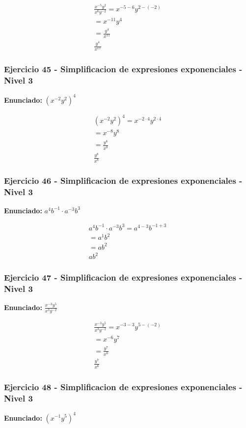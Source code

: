 \documentclass[12pt,a4paper]{article}
\begin{document}
\[
\begin{aligned}
\frac{x^{-5}y^{2}}{x^{6}y^{-2}}=x^{-5-6}y^{2-(-2)}\\
=x^{-11}y^{4}\\
=\frac{y^{4}}{x^{11}}\\
\boxed{\frac{y^{4}}{x^{11}}}
\end{aligned}
\]


\subsubsection*{Ejercicio 45 - Simplificacion de expresiones exponenciales - Nivel 3}
\textbf{Enunciado:} \(\left(x^{-2}y^{2}\right)^{4}\)

\[
\begin{aligned}
\left(x^{-2}y^{2}\right)^{4}=x^{-2\cdot 4}y^{2\cdot 4}\\
=x^{-8}y^{8}\\
=\frac{y^{8}}{x^{8}}\\
\boxed{\frac{y^{8}}{x^{8}}}
\end{aligned}
\]


\subsubsection*{Ejercicio 46 - Simplificacion de expresiones exponenciales - Nivel 3}
\textbf{Enunciado:} \(a^{4}b^{-1}\cdot a^{-3}b^{3}\)

\[
\begin{aligned}
a^{4}b^{-1}\cdot a^{-3}b^{3}=a^{4-3}b^{-1+3}\\
=a^{1}b^{2}\\
=ab^{2}\\
\boxed{ab^{2}}
\end{aligned}
\]


\subsubsection*{Ejercicio 47 - Simplificacion de expresiones exponenciales - Nivel 3}
\textbf{Enunciado:} \(\frac{x^{-3}y^{5}}{x^{3}y^{-2}}\)

\[
\begin{aligned}
\frac{x^{-3}y^{5}}{x^{3}y^{-2}}=x^{-3-3}y^{5-(-2)}\\
=x^{-6}y^{7}\\
=\frac{y^{7}}{x^{6}}\\
\boxed{\frac{y^{7}}{x^{6}}}
\end{aligned}
\]


\subsubsection*{Ejercicio 48 - Simplificacion de expresiones exponenciales - Nivel 3}
\textbf{Enunciado:} \(\left(x^{-1}y^{5}\right)^{4}\)
\end{document}
